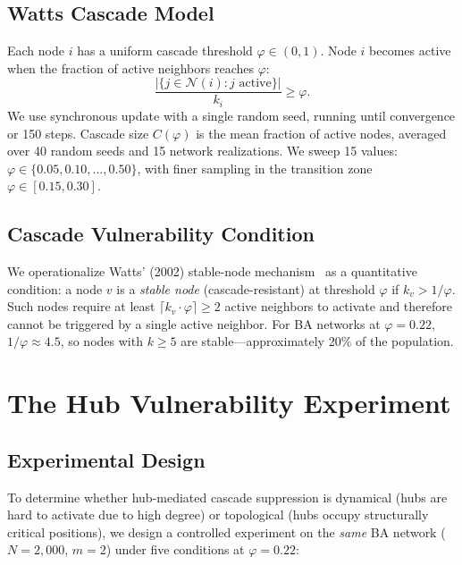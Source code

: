 \documentclass[aps,pre,twocolumn,superscriptaddress,showpacs]{revtex4-2}
\begin{document}
\subsection{Watts Cascade Model}

Each node $i$ has a uniform cascade threshold $\varphi \in (0,1)$. Node $i$ becomes active when the fraction of active neighbors reaches $\varphi$:
\begin{equation*}
\frac{|\{j \in \mathcal{N}(i) : j \text{ active}\}|}{k_i} \geq \varphi.
\end{equation*}
We use synchronous update with a single random seed, running until convergence or 150 steps. Cascade size $C(\varphi)$ is the mean fraction of active nodes, averaged over 40 random seeds and 15 network realizations. We sweep 15 values: $\varphi \in \{0.05, 0.10, \ldots, 0.50\}$, with finer sampling in the transition zone $\varphi \in [0.15, 0.30]$.

\subsection{Cascade Vulnerability Condition}

We operationalize Watts' (2002) stable-node mechanism~\cite{Watts2002} as a quantitative condition: a node $v$ is a \emph{stable node} (cascade-resistant) at threshold $\varphi$ if $k_v > 1/\varphi$. Such nodes require at least $\lceil k_v \cdot \varphi \rceil \geq 2$ active neighbors to activate and therefore cannot be triggered by a single active neighbor. For BA networks at $\varphi=0.22$, $1/\varphi \approx 4.5$, so nodes with $k \geq 5$ are stable---approximately 20\% of the population.

\section{The Hub Vulnerability Experiment}
\label{sec:hub_vuln}

\subsection{Experimental Design}

To determine whether hub-mediated cascade suppression is dynamical (hubs are hard to activate due to high degree) or topological (hubs occupy structurally critical positions), we design a controlled experiment on the \emph{same} BA network ($N=2{,}000$, $m=2$) under five conditions at $\varphi=0.22$:
\end{document}
